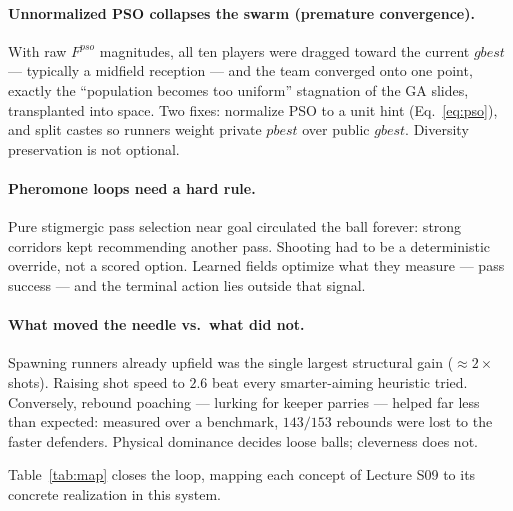 \documentclass[11pt,a4paper]{article}
\begin{document}
\paragraph{Unnormalized PSO collapses the swarm (premature convergence).} With raw
$F^{pso}$ magnitudes, all ten players were dragged toward the current $gbest$ --- typically a
midfield reception --- and the team converged onto one point, exactly the ``population becomes
too uniform'' stagnation of the GA slides, transplanted into space. Two fixes: normalize PSO to
a unit hint (Eq.~\eqref{eq:pso}), and split castes so runners weight private $pbest$ over public
$gbest$. Diversity preservation is not optional.

\paragraph{Pheromone loops need a hard rule.} Pure stigmergic pass selection near goal
circulated the ball forever: strong corridors kept recommending another pass. Shooting had to be
a deterministic override, not a scored option. Learned fields optimize what they measure ---
pass success --- and the terminal action lies outside that signal.

\paragraph{What moved the needle vs.\ what did not.} Spawning runners already upfield was the
single largest structural gain ($\approx 2\times$ shots). Raising shot speed to $2.6$ beat every
smarter-aiming heuristic tried. Conversely, rebound poaching --- lurking for keeper parries ---
helped far less than expected: measured over a benchmark, $143/153$ rebounds were lost to the
faster defenders. Physical dominance decides loose balls; cleverness does not.

Table~\ref{tab:map} closes the loop, mapping each concept of Lecture S09 to its concrete
realization in this system.
\end{document}
